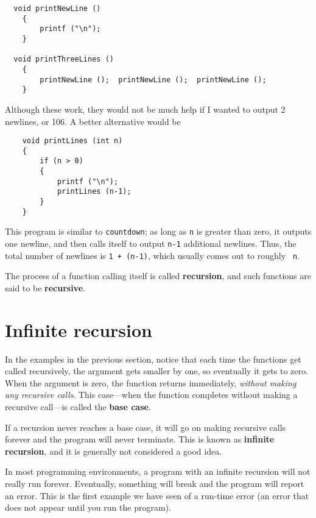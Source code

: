 \begin{verbatim}
  void printNewLine () 
    {
        printf ("\n");
    }

  void printThreeLines () 
    {
        printNewLine ();  printNewLine ();  printNewLine ();
    }
\end{verbatim}
%
Although these work, they would not be much help if I wanted
to output 2 newlines, or 106.  A better alternative would be

\begin{verbatim}
    void printLines (int n) 
    {
        if (n > 0) 
        {
            printf ("\n");
            printLines (n-1);
        }
    }
\end{verbatim}
%
This program is similar to {\tt countdown}; as long as {\tt n} is
greater than zero, it outputs one newline, and then calls itself to
output {\tt n-1} additional newlines.  Thus, the total number of
newlines is {\tt 1 + (n-1)}, which usually comes out to roughly {\tt
n}.


The process of a function calling itself is called {\bf recursion}, and
such functions are said to be {\bf recursive}.

\section {Infinite recursion}

In the examples in the previous section, notice that each time the
functions get called recursively, the argument gets smaller by one, so
eventually it gets to zero.  When the argument is zero, the function
returns immediately, {\em without making any recursive calls}.
This case---when the function completes without making a recursive
call---is called the {\bf base case}.

If a recursion never reaches a base case, it will go on making recursive
calls forever and the program will never terminate.  This is known as
{\bf infinite recursion}, and it is generally not considered a good
idea.


In most programming environments, a program with an infinite
recursion will not really run forever.  Eventually, something
will break and the program will report an error.  This is the
first example we have seen of a run-time error (an error that
does not appear until you run the program).

